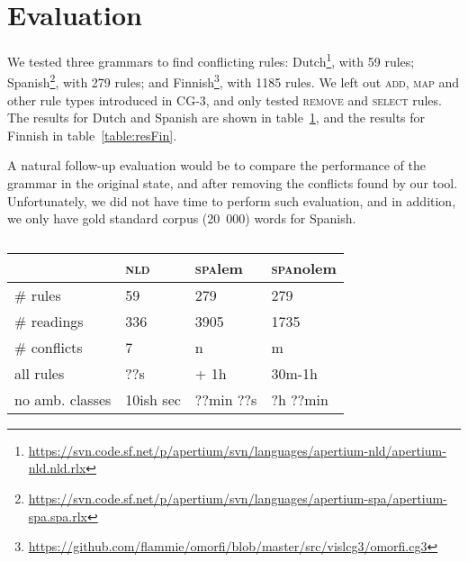 \section{Evaluation}
\label{sec:eval}

We tested three grammars to find conflicting rules: 
Dutch\footnote{\url{https://svn.code.sf.net/p/apertium/svn/languages/apertium-nld/apertium-nld.nld.rlx}},
with 59 rules; 
Spanish\footnote{\url{https://svn.code.sf.net/p/apertium/svn/languages/apertium-spa/apertium-spa.spa.rlx}},
with 279 rules; and 
Finnish\footnote{\url{https://github.com/flammie/omorfi/blob/master/src/vislcg3/omorfi.cg3}},
with 1185 rules. We left out \textsc{add}, \textsc{map} and other rule
types introduced in CG-3, and only tested \textsc{remove} and \textsc{select} rules.
The results for Dutch and Spanish are shown in table~\ref{table:res},
and the results for Finnish in table~\ref{table:resFin}.

A natural follow-up evaluation would be to compare the performance of the
grammar in the original state, and after removing the conflicts found
by our tool. Unfortunately, we did not have time to perform such
evaluation, and in addition, we only have gold standard corpus (20~000) words for Spanish.



\begin{table}[]
\centering
\begin{tabular}{|l|l|l|l|}

\hline
                   & \textsc{nld}  & \textsc{spa}lem  & \textsc{spa}nolem \\ \hline
\# rules           & 59            & 279       & 279     \\ \hline
\# readings        & 336           & 3905      & 1735    \\ \hline
\# conflicts       & 7             & n         & m    \\ \hline
\clock{} all rules & ??s           & + 1h      & 30m-1h   \\ \hline
\clock{} no amb. 
classes            & 10ish sec       & ??min ??s    & ?h ??min    \\ \hline


\end{tabular}
\caption{}
\label{table:res}
\end{table}

